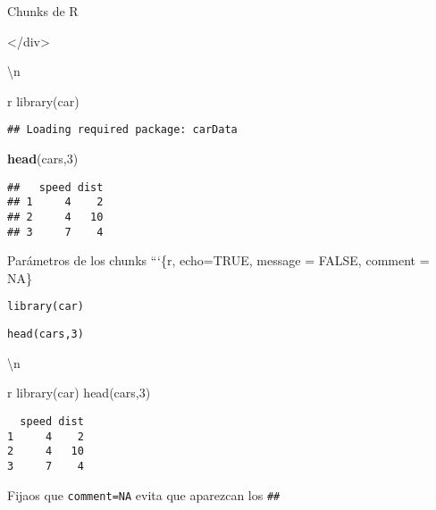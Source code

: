 \documentclass[
  ignorenonframetext,
]{beamer}
\newenvironment{Shaded}{\begin{snugshade}}{\end{snugshade}}
\newcommand{\DecValTok}[1]{\textcolor[rgb]{0.00,0.00,0.81}{#1}}
\newcommand{\FunctionTok}[1]{\textcolor[rgb]{0.13,0.29,0.53}{\textbf{#1}}}
\newcommand{\NormalTok}[1]{#1}
\begin{document}
\begin{frame}[fragile]{Chunks de R}
\begin{Shaded}
\begin{Highlighting}[]
\NormalTok{\textasciigrave{}\textasciigrave{}\textasciigrave{}\textless{}/div\textgreater{}}

\NormalTok{\textbackslash{}n}


\NormalTok{\textasciigrave{}\textasciigrave{}\textasciigrave{}r}
\NormalTok{library(car)}
\end{Highlighting}
\end{Shaded}

\begin{verbatim}
## Loading required package: carData
\end{verbatim}

\begin{Shaded}
\begin{Highlighting}[]
\FunctionTok{head}\NormalTok{(cars,}\DecValTok{3}\NormalTok{)}
\end{Highlighting}
\end{Shaded}

\begin{verbatim}
##   speed dist
## 1     4    2
## 2     4   10
## 3     7    4
\end{verbatim}
\end{frame}

\begin{frame}[fragile]{Parámetros de los chunks}
\protect\hypertarget{paruxe1metros-de-los-chunks}{}
```\{r, echo=TRUE, message = FALSE, comment = NA\}

\texttt{library(car)}

\texttt{head(cars,3)}

\begin{Shaded}
\begin{Highlighting}[]

\NormalTok{\textbackslash{}n}


\NormalTok{\textasciigrave{}\textasciigrave{}\textasciigrave{}r}
\NormalTok{library(car)}
\NormalTok{head(cars,3)}
\end{Highlighting}
\end{Shaded}

\begin{verbatim}
  speed dist
1     4    2
2     4   10
3     7    4
\end{verbatim}

Fijaos que \texttt{comment=NA} evita que aparezcan los \texttt{\#\#}
\end{frame}
\end{document}
